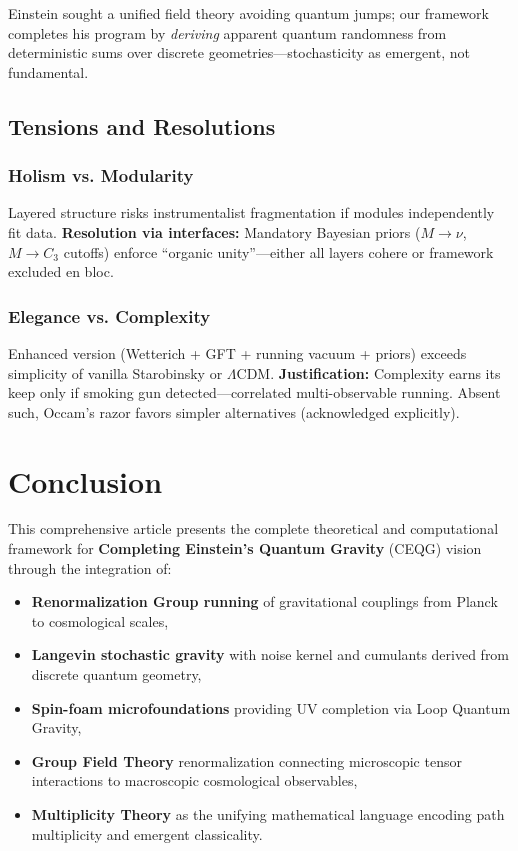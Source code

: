 \documentclass[12pt,a4paper]{article}
\begin{document}
Einstein sought a unified field theory avoiding quantum jumps; our framework completes his program by \textit{deriving} apparent quantum randomness from deterministic sums over discrete geometries—stochasticity as emergent, not fundamental.

\subsection{Tensions and Resolutions}

\subsubsection{Holism vs. Modularity}

Layered structure risks instrumentalist fragmentation if modules independently fit data. \textbf{Resolution via interfaces:} Mandatory Bayesian priors (\(M \to \nu\), \(M \to C_3\) cutoffs) enforce ``organic unity''—either all layers cohere or framework excluded en bloc.

\subsubsection{Elegance vs. Complexity}

Enhanced version (Wetterich + GFT + running vacuum + priors) exceeds simplicity of vanilla Starobinsky or \(\Lambda\)CDM. \textbf{Justification:} Complexity earns its keep only if smoking gun detected—correlated multi-observable running. Absent such, Occam's razor favors simpler alternatives (acknowledged explicitly).

\section{Conclusion}

This comprehensive article presents the complete theoretical and computational framework for \textbf{Completing Einstein's Quantum Gravity} (CEQG) vision through the integration of:

\begin{itemize}
\item \textbf{Renormalization Group running} of gravitational couplings from Planck to cosmological scales,
\item \textbf{Langevin stochastic gravity} with noise kernel and cumulants derived from discrete quantum geometry,
\item \textbf{Spin-foam microfoundations} providing UV completion via Loop Quantum Gravity,
\item \textbf{Group Field Theory} renormalization connecting microscopic tensor interactions to macroscopic cosmological observables,
\item \textbf{Multiplicity Theory} as the unifying mathematical language encoding path multiplicity and emergent classicality.
\end{itemize}
\end{document}
